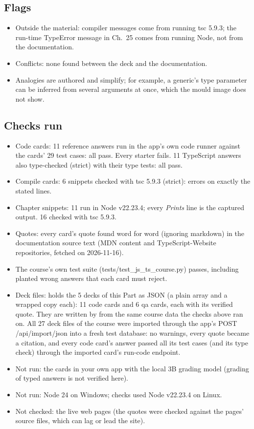 \documentclass[10pt]{article}
\newcommand{\code}[1]{{\ttfamily\small #1}}
\begin{document}
\subsection*{Flags}
{\footnotesize\begin{itemize}
\item Outside the material: compiler messages come from running tsc 5.9.3; the run-time TypeError message in Ch.~25 comes from running Node, not from the documentation.
\item Conflicts: none found between the deck and the documentation.
\item Analogies are authored and simplify; for example, a generic's type parameter can be inferred from several arguments at once, which the mould image does not show.
\end{itemize}}
\subsection*{Checks run}
{\footnotesize\begin{itemize}
\item Code cards: 11 reference answers run in the app's own code runner against the cards' 29 test cases: all pass. Every starter fails. 11 TypeScript answers also type-checked (strict) with their type tests: all pass.
\item Compile cards: 6 snippets checked with tsc 5.9.3 (strict): errors on exactly the stated lines.
\item Chapter snippets: 11 run in Node v22.23.4; every \textit{Prints} line is the captured output. 16 checked with tsc 5.9.3.
\item Quotes: every card's quote found word for word (ignoring markdown) in the documentation source text (MDN content and TypeScript-Website repositories, fetched on 2026-11-16).
\item The course's own test suite (\code{tests/test\_js\_ts\_course.py}) passes, including planted wrong answers that each card must reject.
\item Deck files:  holds the 5 decks of this Part as JSON (a plain array and a wrapped copy each): 11 code cards and 6 qa cards, each with its verified quote. They are written by  from the same course data the checks above ran on. All 27 deck files of the course were imported through the app's \code{POST /api/import/json} into a fresh test database: no warnings, every quote became a citation, and every code card's answer passed all its test cases (and its type check) through the imported card's run-code endpoint.
\item Not run: the cards in your own app with the local 3B grading model (grading of typed answers is not verified here).
\item Not run: Node 24 on Windows; checks used Node v22.23.4 on Linux.
\item Not checked: the live web pages (the quotes were checked against the pages' source files, which can lag or lead the site).
\end{itemize}}
\end{document}
